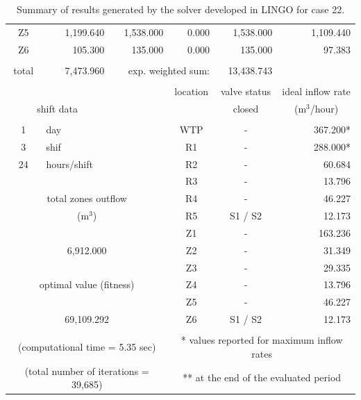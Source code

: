 \documentclass{singlecol}
\theoremstyle{TH}{
\newtheorem{lemma}{Lemma}
\newtheorem{theorem}[lemma]{Theorem}
\newtheorem{corrolary}[lemma]{Corrolary}
\newtheorem{conjecture}[lemma]{Conjecture}
\newtheorem{proposition}[lemma]{Proposition}
\newtheorem{claim}[lemma]{Claim}
\newtheorem{stheorem}[lemma]{Wrong Theorem}
\newtheorem{algorithm}{Algorithm}
}
\theoremstyle{THrm}{
\newtheorem{definition}{Definition}[section]
\newtheorem{question}{Question}[section]
\newtheorem{remark}{Remark}
\newtheorem{scheme}{Scheme}
}
\theoremstyle{THhit}{
\newtheorem{case}{Case}[section]
}
\begin{document}
\begin{table}[h!]
\begin{center}
\begin{small}
\begin{tabular}{ c r r r r r }
	    Z5    & 1,199.640 & 1,538.000 & 0.000 &  1,538.000 & 1,109.440 \\
	    Z6    &   105.300 &   135.000 & 0.000 &    135.000 &    97.383 \\
	    \\
	    total & 7,473.960 & \multicolumn{2}{r}{exp. weighted sum:} & 13,438.743 &              \\
		   \\
		&  &      &  \multicolumn{1}{c}{location}    & \multicolumn{1}{c}{valve status} & \multicolumn{1}{c}{ideal inflow rate}   \\
		\multicolumn{2}{c}{shift data}     &   &      & \multicolumn{1}{c}{closed} & \multicolumn{1}{c}{($\mathrm{m^3}$/hour)} \\
		   \\
1   &  \multicolumn{1}{l}{day} &  & \multicolumn{1}{c}{WTP} & \multicolumn{1}{c}{-} &  367.200* \\
3   &  \multicolumn{1}{l}{shif} & & \multicolumn{1}{c}{R1}  & \multicolumn{1}{c}{-} &  288.000* \\
24  &  \multicolumn{1}{l}{hours/shift} & & \multicolumn{1}{c}{R2} & \multicolumn{1}{c}{-} &   60.684\\
	&      &                  & \multicolumn{1}{c}{R3}     & \multicolumn{1}{c}{-} &    13.796 \\
\multicolumn{3}{c}{total zones outflow} & \multicolumn{1}{c}{R4} & \multicolumn{1}{c}{-}  &   46.227 \\
\multicolumn{3}{c}{($\mathrm{m^3}$)}& \multicolumn{1}{c}{R5}     & \multicolumn{1}{c}{S1 / S2} &    12.173 \\
	   &      &              		& \multicolumn{1}{c}{Z1}     & \multicolumn{1}{c}{-} &   163.236 \\
\multicolumn{3}{c}{6,912.000}       & \multicolumn{1}{c}{Z2}     & \multicolumn{1}{c}{-} &    31.349 \\
	   &      &              		& \multicolumn{1}{c}{Z3}     & \multicolumn{1}{c}{-} &    29.335 \\\multicolumn{3}{c}{optimal value (fitness)} & \multicolumn{1}{c}{Z4} & \multicolumn{1}{c}{-} &13.796 \\
	   &      &             	    & \multicolumn{1}{c}{Z5}     & \multicolumn{1}{c}{-} &    46.227 \\
\multicolumn{3}{c}{69,109.292}       & \multicolumn{1}{c}{Z6}     & \multicolumn{1}{c}{S1 / S2} &    12.173 \\\\
\multicolumn{3}{c}{(computational time  = 5.35 sec)}     & \multicolumn{3}{c}{* values reported for maximum inflow rates} \\
\multicolumn{3}{c}{(total number of iterations = 39,685)}   & \multicolumn{3}{c}{** at the end of the evaluated period} 
	\end{tabular}
\end{small}
\caption{Summary of results generated by the solver developed in LINGO for case 22.}
\label{tab:lingoEvalCase22}
\end{center}
\end{table}
\end{document}
